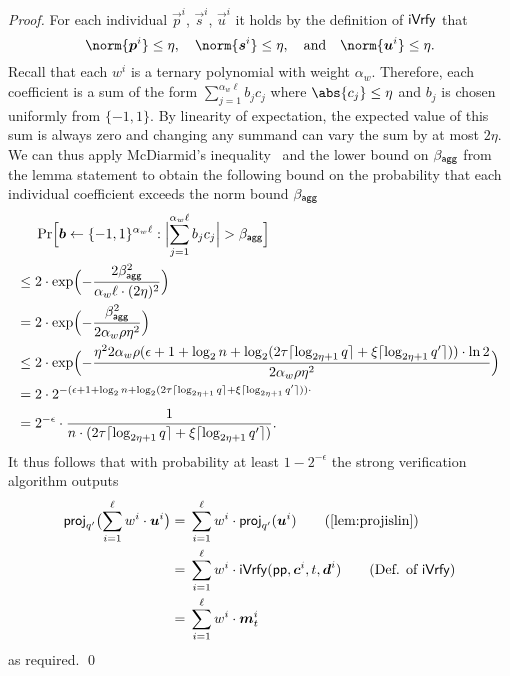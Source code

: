 \begin{proof}
  For each individual $\vec{p}^i$, $\vec{s}^i$, $\vec{u}^i$ it holds by the definition of $\mathsf{iVrfy}$ that
  \[
    \norm{\vec{p}^i} \leq \eta, \quad \norm{\vec{s}^i} \leq \eta,\quad \text{and} \quad\norm{\vec{u}^i}\leq \eta.
  \]
  Recall that each $w^i$ is a ternary polynomial with weight $\alpha_w$.
  Therefore, each coefficient is a sum of the form
  \(
    \sum_{j=1}^{\alpha_w\ell}b_j c_j
  \)
  where $\abs{c_j}\leq \eta$ and $b_j$ is chosen uniformly from $\{-1,1\}$.
  By linearity of expectation, the expected value of this sum is always zero and changing any summand can vary the sum by at most $2\eta$. We can thus apply McDiarmid's inequality~\cite{McDiarmid89} and the lower bound on $\beta_{\mathsf{agg}}$ from the lemma statement to obtain the following bound on the probability that each individual coefficient exceeds the norm bound $\beta_{\mathsf{agg}}$
  \begin{align*}
    &\Pr\Bigl[\vec{b}\gets\{-1,1\}^{\alpha_w\ell} : \Bigl|\smashoperator{\sum_{j=1}^{\alpha_w\ell}}b_j c_j\Bigr| > \bagg\Bigr]\\
    \leq{}& 2\cdot\exp\Bigl(-\frac{2\bagg^2}{\alpha_w\ell\cdot (2\eta)^2}\Bigr)\\
    ={}& 2\cdot\exp\Bigl(-\frac{\bagg^2}{2\alpha_w\rho \eta^2}\Bigr)\\
    \leq{}& 2\cdot\exp\Bigl(-\frac{\eta^2 2\alpha_w\rho(\epsilon + 1 +\log_2 n + \log_2(2\tau \lceil\log_{2\eta+1}q\rceil + \xi\lceil\log_{2\eta+1}q'\rceil))\cdot\ln2}{2\alpha_w\rho \eta^2}\Bigr)\\
    ={}& 2\cdot 2^{-(\epsilon + 1 +\log_2 n + \log_2(2\tau \lceil\log_{2\eta+1}q\rceil + \xi\lceil\log_{2\eta+1}q'\rceil))\cdot}\\
    ={}& 2^{-\epsilon}\cdot\frac{1}{n\cdot(2\tau \lceil\log_{2\eta+1}q\rceil + \xi\lceil\log_{2\eta+1}q'\rceil)}.
  \end{align*}
  It thus follows that with probability at least $1-2^{-\epsilon}$ the strong verification algorithm outputs
  \begin{align*}
    \proj_{q'}\bigl(\sum_{i=1}^{\ell}w^i \cdot \vec{u}^i\bigr)
    ={}&\sum_{i=1}^{\ell}w^i \cdot \proj_{q'}(\vec{u}^i)\tag{\autoref{lem:projislin}}\\
    ={}&\sum_{i=1}^{\ell}w^i \cdot \iverify(\params,\vec{c}^i,t,\vec{d}^i)\tag{Def. of $\iverify$}\\
    ={}&\sum_{i=1}^{\ell}w^i \cdot \vec{m}_t^i
  \end{align*}
  as required.
  \qed
\end{proof}

